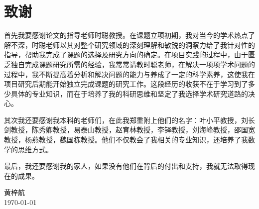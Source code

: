 
\chapter{致谢}

首先我要感谢论文的指导老师时聪教授。在课题立项初期，我对当今的学术热点了解不深，时聪老师以其对整个研究领域的深刻理解和敏锐的洞察力给了我针对性的指导，帮助我完成了课题的选择及研究方向的确定。在项目实践的过程中，由于匮乏独自完成课题研究所需的经验，我常常请教时聪老师，在解决一项项学术问题的过程中，我不断提高着分析和解决问题的能力与养成了一定的科学素养，这使我在项目研究后期能开始独立完成课题的研究工作。这段经历的收获不在于学习到了多少具体的专业知识，而在于培养了我的科研思维和坚定了我选择学术研究道路的决心。

其次我还要感谢我本科的老师们，在此我郑重附上他们的名字：叶小平教授，刘长剑教授，陈秀卿教授，易泰山教授，赵育林教授，李铎教授，刘海峰教授，邵国宽教授，杨燕教授，魏国栋教授。他们不仅教会了我相关的专业知识，还培养了我数学的思维方式。

最后，我还要感谢我的家人，如果没有他们在背后的付出和支持，我就无法取得现在的成果。

\vskip 108pt
\begin{flushright}
	黄梓航\makebox[1cm]{} \\
	\today
\end{flushright}

